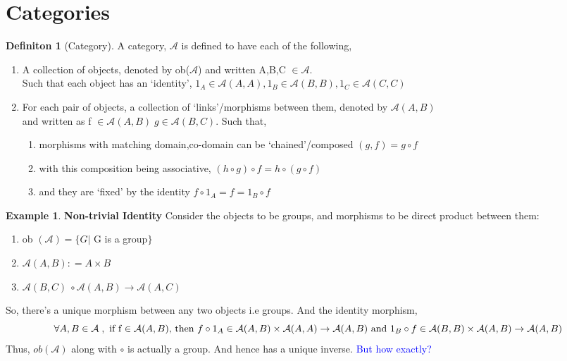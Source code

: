\documentclass{article}
\theoremstyle{definition}
\newtheorem{example}{Example}[section]
\theoremstyle{definition}
\newtheorem{definition}{Definiton}[section]
\theoremstyle{definition}
\theoremstyle{definition}
\begin{document}
\section{Categories} \label{sec:Categories}
\begin{definition}[Category] %
	A category, $\mathcal{A}$ is defined to have each of the following,
	\begin{enumerate}[label=(\roman*)]
		\item A collection of objects, denoted by ob($\mathcal{A}$) and written A,B,C $\in \mathcal{A}$.\\
			Such that each object has an `identity', $ 1_A \in \mathcal{A}(A,A) , 1_B \in \mathcal{A}(B,B), 1_C \in \mathcal{A}(C,C)$
		\item For each pair of objects, a collection of `links'/morphisms between them, denoted by $\mathcal{A}(A,B)$ \\and written as f $ \in \mathcal{A}(A,B) \; g \in \mathcal{A}(B,C) $. Such that,
			\begin{enumerate}[label=(\alph*)]
				\item morphisms with matching domain,co-domain can be `chained'/composed $ (g,f)=g \circ f $
				\item with this composition being associative, $ (h \circ g)\circ f=h \circ ( g \circ f) $
				\item and they are `fixed' by the identity $ f \circ 1_A =f= 1_B \circ f $
			\end{enumerate}
	\end{enumerate}
\end{definition}
\begin{example} {\textbf{Non-trivial Identity \;}}%
	Consider the objects to be groups, and morphisms to be direct product between them:
	\begin{enumerate}[label=\roman*]%
		\item ob $ (\mathcal{A}) = \{ G | $  G is a group$ \} $
		\item $  \mathcal{A}(A,B) : = A \times B $
		\item  $ \mathcal{A}(B,C) \ \circ \mathcal{A}(A,B) \rightarrow \mathcal{A}(A,C) $
	\end{enumerate}
	So, there's a unique morphism between any two objects i.e groups. And the identity morphism,
	\[ \forall A,B  \in \mathbb{\mathcal{A} }\;, \text{ if f $ \in \mathcal{A}(A,B)$, then }  f \circ 1_A \in \mathcal{A}(A,B) \times \mathcal{A}(A,A) \rightarrow \mathcal{A}(A,B) \text{ and } 1_B \circ f \in \mathcal{A}(B,B) \times \mathcal{A}(A,B) \rightarrow \mathcal{A}(A,B) \]
	Thus, $ ob(\mathcal{A} ) $ along with $ \circ  $ is actually a group. And hence has a unique inverse.
	\textcolor{blue} {But how exactly?}
\end{example}
\end{document}
